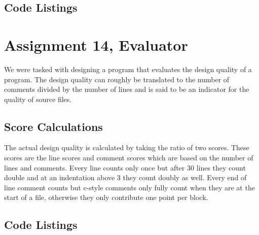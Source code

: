 \documentclass[a4paper]{article}
\begin{document}

\subsection*{Code Listings}





%
%
%
%
%

\section*{Assignment 14, Evaluator}
We were tasked with designing a program that evaluates the design quality of a program.
The design quality can roughly be translated to the number of comments divided by the number of lines and is said to be an indicator for the quality of source files.

\subsection*{Score Calculations}
The actual design quality is calculated by taking the ratio of two scores.
These scores are the line scores and comment scores which are based on the number of lines and comments.
Every line counts only once but after 30 lines they count double and at an indentation above 3 they count doubly as well.
Every end of line comment counts but c-style comments only fully count when they are at the start of a file, otherwise they only contribute one point per block.

\subsection*{Code Listings}









\end{document}
